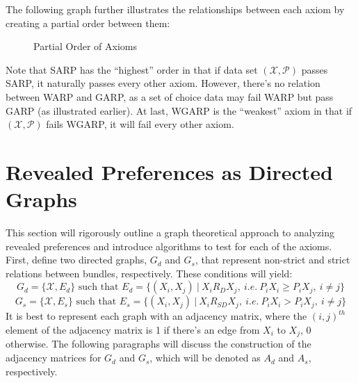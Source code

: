 \documentclass{article} %
\theoremstyle{style1}
\theoremstyle{style1}
\theoremstyle{example}
\begin{document}
The following graph further illustrates the relationships between each axiom by creating a partial order between them:
\begin{figure}[H]
\centering
{}
\caption{Partial Order of Axioms} \label{fig:PartialOrder1}
\end{figure}
Note that SARP has the ``highest'' order in that if data set $(\mathcal{X},\mathcal{P})$ passes SARP, it naturally passes every other axiom. However, there's no relation between WARP and GARP, as a set of choice data may fail WARP but pass GARP (as illustrated earlier). At last, WGARP is the ``weakest'' axiom in that if $(\mathcal{X},\mathcal{P})$ fails WGARP, it will fail every other axiom.

\section{Revealed Preferences as Directed Graphs}\label{sec:rev_pref_as_digraph}

This section will rigorously outline a graph theoretical approach to analyzing revealed preferences and introduce algorithms to test for each of the axioms. First, define two directed graphs, $G_d$ and $G_s$, that represent non-strict and strict relations between bundles, respectively. These conditions will yield:
$$G_d=\{\mathcal{X},E_d\}\textrm{ such that }E_d=\{(X_i,X_j)\ |\ X_i R_D X_j,\ i.e.\ P_iX_i\geq P_iX_j,\ i\not=j\}$$
$$G_s=\{\mathcal{X},E_s\}\textrm{ such that }E_s=\{(X_i,X_j)\ |\ X_i R_{SD} X_j,\ i.e.\ P_iX_i> P_iX_j,\ i\not=j\}$$
It is best to represent each graph with an adjacency matrix, where the $(i,j)^{th}$ element of the adjacency matrix is 1 if there's an edge from $X_i$ to $X_j$, 0 otherwise. The following paragraphs will discuss the construction of the adjacency matrices for $G_d$ and $G_s$, which will be denoted as $A_d$ and $A_s$, respectively.
\end{document}
